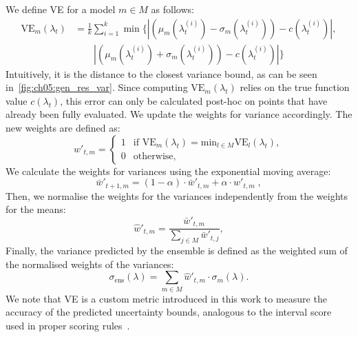 We define VE for a model $m\in M$ as follows:
\begin{equation}
  \begin{aligned}
    \text{VE}_m(\lambda_t) &= \frac{1}{k}\sum_{i=1}^{k} \min \{|(\mu_m(\lambda_t^{(i)}) - \sigma_m(\lambda_t^{(i)}))- c(\lambda_t^{(i)})|,\\
      &\qquad |(\mu_m(\lambda_t^{(i)}) + \sigma_m(\lambda_t^{(i)}))- c(\lambda_t^{(i)})|\}
  \end{aligned}
\end{equation}
Intuitively, it is the distance to the closest variance bound, as can be seen in~\cref{fig:ch05:gen_res_var}. 
Since computing $\text{VE}_m(\lambda_t)$ relies on the true function value $c(\lambda_t)$, this error can only be calculated post-hoc on points that have already been fully evaluated.
We update the weights for variance accordingly. 
The new weights are defined as:
\begin{equation}\label{eq:ch05:weight_var}
    {w}'_{t,m}=
    \begin{cases}
        1 & \text{if } \text{VE}_m(\lambda_t)=\text{min}_{l\in M} \text{VE}_l(\lambda_t),  \\
        0 & \text{otherwise},
    \end{cases}
\end{equation}
We calculate the weights for variances using the exponential moving average:
\begin{equation}
    \bar{w}'_{t+1,m} = (1-\alpha) \cdot \bar{w}'_{t, m} + \alpha  \cdot {w}'_{t,m} \; ,
    \label{eq:ch05:weight_ema_var}
\end{equation}
Then, we normalise the weights for the variances independently from the weights for the means:
\begin{equation}
    \hat{w}'_{t,m} = \frac{\bar{w}'_{t,m}}{\sum_{j\in M}{\bar{w}'_{t, j}}},
\end{equation}
Finally, the variance predicted by the ensemble is defined as the weighted sum of the normalised weights of the variances:
\begin{equation}
    \sigma_{\text{ens}}(\lambda)= \sum_{m\in M} \hat{w}'_{t,m} \cdot \sigma_{m}(\lambda).
    \label{eq:ch05:ens_sigma_var}
\end{equation}
We note that VE is a custom metric introduced in this work to measure the accuracy of the predicted uncertainty bounds, analogous to the interval score used in proper scoring rules~\citep{GneRaf07}.

